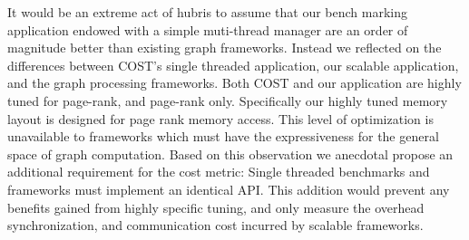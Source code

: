 It would be an extreme act of hubris to assume that our bench marking
application endowed with a simple muti-thread manager are an order of
magnitude better than existing graph frameworks. Instead we reflected on
the differences between COST's single threaded application, our
scalable application, and the graph processing frameworks. Both COST
and our application are highly tuned for page-rank, and page-rank
only. Specifically our highly tuned memory layout is designed for page
rank memory access. This level of optimization is unavailable to
frameworks which must have the expressiveness for the general space of
graph computation. Based on this observation we anecdotal propose an
additional requirement for the cost metric: Single threaded benchmarks
and frameworks must implement an identical API. This addition would
prevent any benefits gained from highly specific tuning, and only
measure the overhead synchronization, and communication cost incurred
by scalable frameworks.


